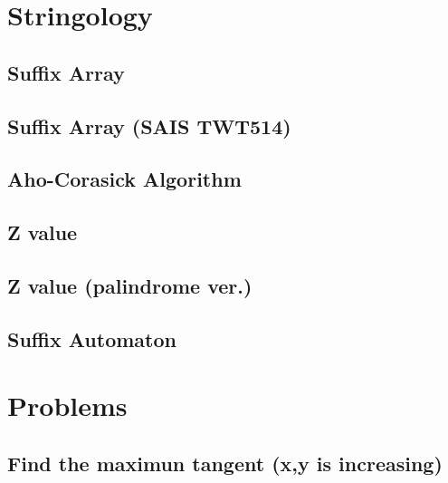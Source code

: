 \documentclass[10pt,twocolumn,oneside]{article}
\begin{document}
\section{Stringology}
\subsection{Suffix Array}


\subsection{Suffix Array (SAIS TWT514)}


\subsection{Aho-Corasick Algorithm}


\subsection{Z value}


\subsection{Z value (palindrome ver.)}


\subsection{Suffix Automaton}


\newpage

\section{Problems}
%

\subsection{Find the maximun tangent (x,y is increasing)}


%

%
\end{document}
